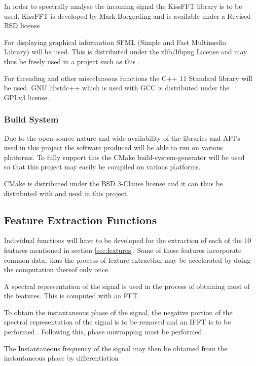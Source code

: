 \documentclass[10pt,twocolumn]{witseiepaper}
\begin{document}
			In order to spectrally analyse the incoming signal the KissFFT library is to be used. KissFFT is developed by Mark Borgerding and is available under a Revised BSD license \cite{kissfft_license}

			For displaying graphical information SFML (Simple and Fast Multimedia Library) will be used. This is distributed under the zlib/libpng License and may thus be freely used in a project such as this \cite{sfml_license}.

			For threading and other miscelaneous functions the C++ 11 Standard library will be used. GNU libstdc++ which is used with GCC is distributed under the GPLv3 license.

		\subsubsection{Build System}
			Due to the open-source nature and wide availability of the libraries and API's used in this project the software produced will be able to run on various platforms. To fully support this the CMake build-system-generator will be used so that this project may easily be compiled on various platforms.

			CMake is distributed under the BSD 3-Clause license \cite{cmake_license} and it can thus be distributed with and used in this project.

			\subsection{Feature Extraction Functions}
			Individual functions will have to be developed for the extraction of each of the 10 features mentioned in section \ref{sec:features}. Some of these features incorporate common data, thus the process of feature extraction may be accelerated by doing the computation thereof only once.

			A spectral representation of the signal is used in the process of obtaining most of the features. This is computed with an FFT. 
			
			To obtain the instantaneous phase of the signal, the negative portion of the spectral representation of the signal is to be removed and an IFFT is to be performed \cite{picinbono1997instantaneous}. Following this, phase unwrapping must be performed \cite{park2009introduction, picinbono1997instantaneous}.

			The Instantaneous frequency of the signal may then be obtained from the instantaneous phase by differentiation \cite{park2009introduction}
\end{document}
